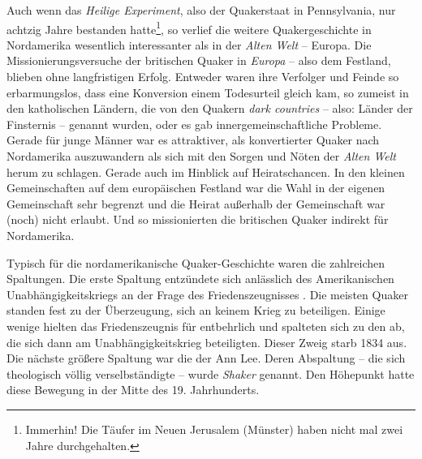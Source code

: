 \medskip

Auch wenn das \textit{Heilige Experiment}, also der Quakerstaat in Pennsylvania,
nur achtzig Jahre
bestanden hatte\footnote{Immerhin! Die Täufer im Neuen Jerusalem (Münster)
 haben
nicht mal zwei Jahre durchgehalten.}, so verlief die weitere
Quakergeschichte in Nordamerika wesentlich interessanter als in der
\textit{Alten
Welt} -- Europa. Die Missionierungsversuche der britischen
Quaker in
\textit{Europa} -- also dem Festland, blieben ohne
langfristigen Erfolg.
Entweder waren ihre Verfolger und Feinde so erbarmungslos,
dass eine
Konversion einem Todesurteil gleich kam, so zumeist in den katholischen
Ländern, die von den Quakern \textit{dark countries} -- also: Länder der
Finsternis -- genannt wurden, oder es gab innergemeinschaftliche Probleme.
Gerade
für junge Männer war es attraktiver, als konvertierter Quaker nach Nordamerika
auszuwandern als sich mit den Sorgen und Nöten der \textit{Alten Welt} herum
zu
schlagen. Gerade auch im Hinblick auf Heiratschancen. In den
kleinen
Gemeinschaften auf dem europäischen Festland war die Wahl in der eigenen
Gemeinschaft sehr begrenzt und die Heirat außerhalb der Gemeinschaft war (noch)
nicht erlaubt. Und so missionierten die britischen Quaker indirekt für
Nordamerika.

\medskip

Typisch für die nordamerikanische Quaker-Geschichte waren die zahlreichen
Spaltungen. Die erste Spaltung entzündete sich anlässlich des
Amerikanischen
Unabhängigkeitskriegs an der Frage des Friedenszeugnisses
. Die meisten Quaker
standen fest zu der Überzeugung, sich an keinem Krieg zu
beteiligen. Einige
wenige hielten das Friedenszeugnis für entbehrlich und spalteten sich zu den
 ab,
die sich dann am Unabhängigkeitskrieg
beteiligten. Dieser Zweig starb 1834 aus. Die nächste größere Spaltung war die
der Ann Lee. Deren Abspaltung -- die sich theologisch
völlig verselbständigte --
wurde \textit{Shaker} genannt. Den Höhepunkt hatte
diese Bewegung in der Mitte
des 19. Jahrhunderts.

\medskip

